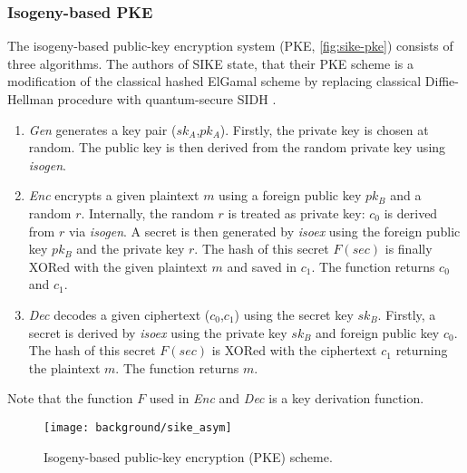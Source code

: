 \subsubsection{Isogeny-based \gls{PKE}}
The isogeny-based public-key encryption system (\gls{PKE}, \autoref{fig:sike-pke}) consists of three algorithms. The authors of \gls{SIKE} state, that their \gls{PKE} scheme is a modification of the classical hashed ElGamal scheme by replacing classical Diffie-Hellman procedure with quantum-secure \gls{SIDH} \parencite{sike2020spec}.
\begin{enumerate}
\item \textit{Gen} generates a key pair ($sk_A$,$pk_A$). Firstly, the private key is chosen at random. The public key is then derived from the random private key using \textit{isogen}.
\item \textit{\gls{Enc}} encrypts a given plaintext $m$ using a foreign public key $pk_B$ and a random $r$. Internally, the random $r$ is treated as private key: $c_0$ is derived from $r$ via \textit{isogen}. A secret is then generated by \textit{isoex} using the foreign public key $pk_B$ and the private key $r$. The hash of this secret $F(sec)$ is finally XORed with the given plaintext $m$ and saved in $c_1$. The function returns $c_0$ and $c_1$.
\item \textit{\gls{Dec}} decodes a given ciphertext ($c_0$,$c_1$) using the secret key $sk_B$. Firstly, a secret is derived by \textit{isoex} using the private key $sk_B$ and foreign public key $c_0$. The hash of this secret $F(sec)$ is XORed with the ciphertext $c_1$ returning the plaintext $m$. The function returns $m$.
\end{enumerate}
Note that the function $F$ used in \textit{\gls{Enc}} and \textit{\gls{Dec}} is a key derivation function.

\begin{figure}[H]
  \centering
  \texttt{[image: background/sike\_asym]}
  \caption[Isogeny-based \gls{PKE}]
  {Isogeny-based public-key encryption (\gls{PKE}) scheme.} \label{fig:sike-pke}
\end{figure}

